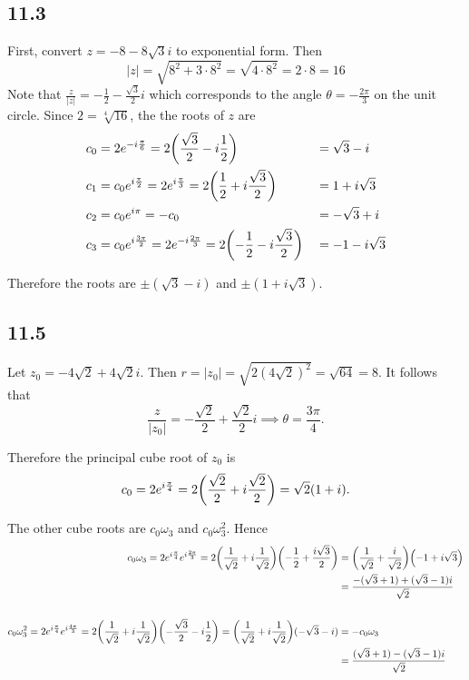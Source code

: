 \documentclass[12pt,titlepage]{extarticle}
\begin{document}
\subsection*{11.3}
First, convert $z = -8 - 8 \sqrt{3}i$ to exponential form. Then
\[
    |z| = \sqrt{8^2 + 3\cdot 8^2} = \sqrt{4 \cdot 8^2} = 2\cdot 8 = 16
\]
Note that $\frac{z}{|z|} = -\frac{1}{2} - \frac{\sqrt{3}}{2} i$ which corresponds to the angle $\theta = - \frac{2 \pi}{3}$ on the unit circle. Since $2 = \sqrt[4]{16}$, the the roots of $z$ are
\begin{alignat*}{3}
    c_0 &= 2 e^{-i \frac{\pi}{6}} = 2\qty(\frac{\sqrt{3}}{2} - i\frac{1}{2}) &&= \sqrt{3} - i \\
    c_1 &= c_0 e^{i\frac{\pi}{2}} = 2 e^{i \frac{\pi}{3}} = 2\qty(\frac{1}{2} + i \frac{\sqrt{3}}{2}) &&= 1 + i\sqrt{3} \\
    c_2 &= c_0 e^{i\pi} = -c_0 &&= - \sqrt{3} + i \\
    c_3 &= c_0 e^{i \frac{3 \pi}{2}} = 2 e^{-i \frac{2 \pi}{3}} = 2\qty(-\frac{1}{2} - i\frac{\sqrt{3}}{2}) &&= -1 - i\sqrt{3} \\
\end{alignat*}

Therefore the roots are $\pm(\sqrt{3} - i)$ and $\pm(1 + i \sqrt{3})$.

\subsection*{11.5}
Let $z_0 = - 4\sqrt{2} + 4 \sqrt{2}i$. Then $r = |z_0| = \sqrt{2(4 \sqrt{2})^2} = \sqrt{64} = 8$. It follows that
\[
    \frac{z}{|z_0|} = -\frac{\sqrt{2}}{2} + \frac{\sqrt{2}}{2}i \implies \theta = \frac{3 \pi}{4}
.\]

Therefore the principal cube root of $z_0$ is
\[
    c_0 = 2 e^{i \frac{\pi}{4}} = 2\qty(\frac{\sqrt{2}}{2} + i \frac{\sqrt{2}}{2}) = \sqrt{2}(1+i)
.\]

The other cube roots are $c_0 \omega_3$ and $c_0 \omega_3^2$. Hence
\begin{align*}
    c_0 \omega_3 = 
    2 e^{i \frac{\pi}{4}} e^{i \frac{2 \pi}{3}} = 
    2 \qty(\frac{1}{\sqrt{2}} + i \frac{1}{\sqrt{2}}) \qty(-\frac{1}{2} + \frac{i\sqrt{3}}{2})
    &= \qty(\frac{1}{\sqrt{2}} + \frac{i}{\sqrt{2}})\qty(-1 + i\sqrt{3}) \\
    &= \frac{-(\sqrt{3} + 1) + (\sqrt{3} - 1)i}{\sqrt{2}} \\\\
    c_0 \omega_3^2 = 2 e^{i \frac{\pi}{4}} e^{i \frac{4 \pi}{3}} = 2 \qty(\frac{1}{\sqrt{2}} + i \frac{1}{\sqrt{2}}) \qty(-\frac{\sqrt{3}}{2} - i \frac{1}{2}) = \qty(\frac{1}{\sqrt{2}} + i \frac{1}{\sqrt{2}}) ( -\sqrt{3} - i) &= -c_0 \omega_3 \\
    &= \frac{(\sqrt{3} + 1) - (\sqrt{3} - 1)i}{\sqrt{2}} \\
\end{align*}
\end{document}

